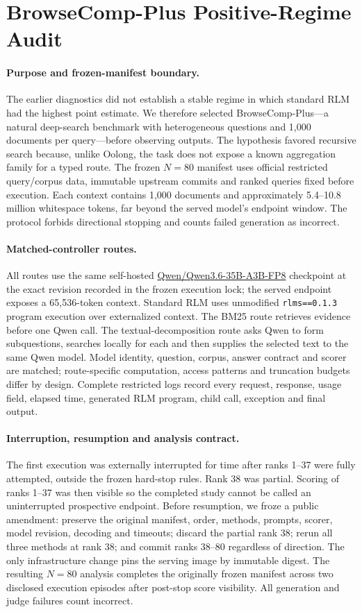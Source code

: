 \documentclass[letterpaper]{article}
\begin{document}
\section{BrowseComp-Plus Positive-Regime Audit}

\paragraph{Purpose and frozen-manifest boundary.}
The earlier diagnostics did not establish a stable regime in which standard RLM had the highest point estimate. We therefore selected BrowseComp-Plus---a natural deep-search benchmark with heterogeneous questions and 1,000 documents per query---before observing outputs. The hypothesis favored recursive search because, unlike Oolong, the task does not expose a known aggregation family for a typed route. The frozen $N=80$ manifest uses official restricted query/corpus data, immutable upstream commits and ranked queries fixed before execution. Each context contains 1,000 documents and approximately 5.4--10.8 million whitespace tokens, far beyond the served model's endpoint window. The protocol forbids directional stopping and counts failed generation as incorrect.

\paragraph{Matched-controller routes.}
All routes use the same self-hosted \url{Qwen/Qwen3.6-35B-A3B-FP8} checkpoint at the exact revision recorded in the frozen execution lock; the served endpoint exposes a 65,536-token context. Standard RLM uses unmodified \texttt{rlms==0.1.3} program execution over externalized context. The BM25 route retrieves evidence before one Qwen call. The textual-decomposition route asks Qwen to form subquestions, searches locally for each and then supplies the selected text to the same Qwen model. Model identity, question, corpus, answer contract and scorer are matched; route-specific computation, access patterns and truncation budgets differ by design. Complete restricted logs record every request, response, usage field, elapsed time, generated RLM program, child call, exception and final output.

\paragraph{Interruption, resumption and analysis contract.}
The first execution was externally interrupted for time after ranks 1--37 were fully attempted, outside the frozen hard-stop rules. Rank 38 was partial. Scoring of ranks 1--37 was then visible so the completed study cannot be called an uninterrupted prospective endpoint. Before resumption, we froze a public amendment: preserve the original manifest, order, methods, prompts, scorer, model revision, decoding and timeouts; discard the partial rank 38; rerun all three methods at rank 38; and commit ranks 38--80 regardless of direction. The only infrastructure change pins the serving image by immutable digest. The resulting $N=80$ analysis completes the originally frozen manifest across two disclosed execution episodes after post-stop score visibility. All generation and judge failures count incorrect.
\end{document}
